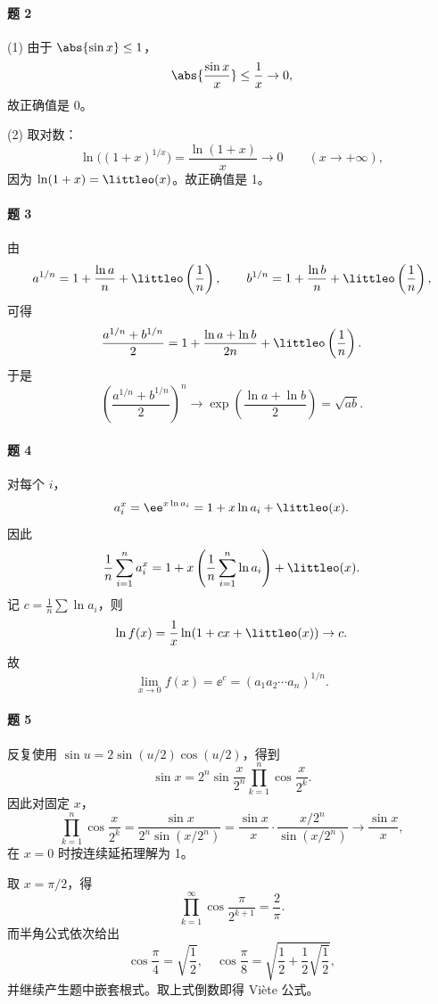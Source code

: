 \paragraph{题 2}
\begin{xsolution}
(1) 由于 $\abs{\sin x}\leq1$，
\[
  \abs{\frac{\sin x}{x}}\leq\frac1x\to0,
\]
故正确值是 0。

(2) 取对数：
\[
  \ln\bigl((1+x)^{1/x}\bigr)=\frac{\ln(1+x)}x\to0
  \qquad(x\to+\infty),
\]
因为 $\ln(1+x)=\littleo(x)$。故正确值是 1。
\end{xsolution}

\paragraph{题 3}
\begin{xsolution}
由
\[
  a^{1/n}=1+\frac{\ln a}{n}+\littleo\left(\frac1n\right),\qquad
  b^{1/n}=1+\frac{\ln b}{n}+\littleo\left(\frac1n\right),
\]
可得
\[
  \frac{a^{1/n}+b^{1/n}}2
  =1+\frac{\ln a+\ln b}{2n}+\littleo\left(\frac1n\right).
\]
于是
\[
  \left(\frac{a^{1/n}+b^{1/n}}2\right)^n
  \to\exp\left(\frac{\ln a+\ln b}{2}\right)=\sqrt{ab}.
\]
\end{xsolution}

\paragraph{题 4}
\begin{xsolution}
对每个 $i$，
\[
  a_i^x=\ee^{x\ln a_i}=1+x\ln a_i+\littleo(x).
\]
因此
\[
  \frac1n\sum_{i=1}^n a_i^x
  =1+x\left(\frac1n\sum_{i=1}^n\ln a_i\right)+\littleo(x).
\]
记 $c=\frac1n\sum\ln a_i$，则
\[
  \ln f(x)=\frac1x\ln(1+cx+\littleo(x))\to c.
\]
故
\[
  \lim_{x\to0}f(x)=\ee^c=(a_1a_2\cdots a_n)^{1/n}.
\]
\end{xsolution}

\paragraph{题 5}
\begin{xsolution}
反复使用 $\sin u=2\sin(u/2)\cos(u/2)$，得到
\[
  \sin x=2^n\sin\frac{x}{2^n}\prod_{k=1}^n\cos\frac{x}{2^k}.
\]
因此对固定 $x$，
\[
  \prod_{k=1}^n\cos\frac{x}{2^k}
  =\frac{\sin x}{2^n\sin(x/2^n)}
  =\frac{\sin x}{x}\cdot\frac{x/2^n}{\sin(x/2^n)}
  \to\frac{\sin x}{x},
\]
在 $x=0$ 时按连续延拓理解为 1。

取 $x=\pi/2$，得
\[
  \prod_{k=1}^{\infty}\cos\frac{\pi}{2^{k+1}}=\frac2\pi.
\]
而半角公式依次给出
\[
  \cos\frac\pi4=\sqrt{\frac12},
  \quad
  \cos\frac\pi8=\sqrt{\frac12+\frac12\sqrt{\frac12}},
\]
并继续产生题中嵌套根式。取上式倒数即得 Viète 公式。
\end{xsolution}

